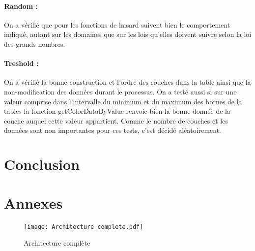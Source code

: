 \documentclass[a4paper]{article}
\begin{document}
\paragraph{Random : } On a vérifié que pour les fonctions de hasard suivent bien le comportement indiqué, autant sur les domaines que sur les lois qu'elles doivent suivre selon la loi des grands nombres.

\paragraph{Treshold : } On a vérifié la bonne construction et l'ordre des couches dans la table ainsi que la non-modification des données durant le processus. 
On a testé aussi si sur une valeur comprise dans l'intervalle du minimum et du maximum des bornes de la tables la fonction getColorDataByValue renvoie bien la bonne donnée de la couche auquel cette valeur appartient.
Comme le nombre de couches et les données sont non importantes pour ces tests, c'est décidé aléatoirement.

\section{Conclusion}

\section{Annexes}

\begin{figure}[!h]
    \begin{center}
        \texttt{[image: Architecture\_complete.pdf]} 
        \caption{Architecture complète}
        \label{archiComplete}
    \end{center}
\end{figure}

\newpage


\end{document}
